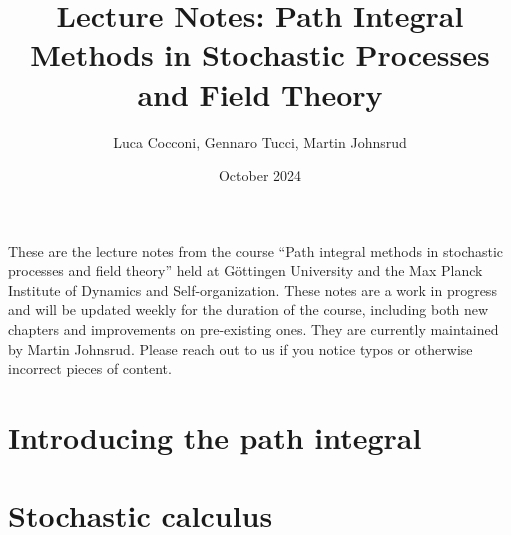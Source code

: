 \documentclass[10pt, a4paper, oneside]{book}
\title{Lecture Notes: Path Integral Methods in Stochastic Processes and Field Theory}
\author{Luca Cocconi, Gennaro Tucci, Martin Johnsrud}
\date{October 2024}
\begin{document}
\maketitle
\tableofcontents
\clearpage

These are the lecture notes from the course ``Path integral methods in stochastic processes and field theory'' held at Göttingen University and the Max Planck Institute of Dynamics and Self-organization. These notes are a work in progress and will be updated weekly for the duration of the course, including both new chapters and improvements on pre-existing ones. They are currently maintained by Martin Johnsrud. Please reach out to us if you notice typos or otherwise incorrect pieces of content. 


\chapter{Introducing the path integral}


\chapter{Stochastic calculus}

\end{document}
